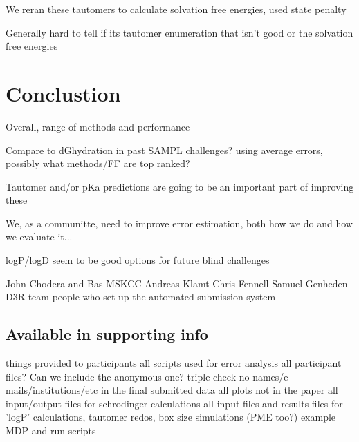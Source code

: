 We reran these tautomers to calculate solvation free energies, used state penalty %

Generally hard to tell if its tautomer enumeration that isn't good or the solvation free energies

\section{Conclustion}
\label{conclusions}

Overall, range of methods and performance

Compare to dGhydration in past SAMPL challenges? using average errors, possibly what methods/FF are top ranked?

Tautomer and/or pKa predictions are going to be an important part of improving these

We, as a communitte, need to improve error estimation, both how we do and how we evaluate it...

logP/logD seem to be good options for future blind challenges

\begin{acknowledgements} %
John Chodera and Bas MSKCC
Andreas Klamt
Chris Fennell
Samuel Genheden
D3R team
people who set up the automated submission system %


\end{acknowledgements}

\subsection{Available in supporting info} %
things provided to participants
all scripts used for error analysis
all participant files? Can we include the anonymous one? 
triple check no names/e-mails/institutions/etc in the final submitted data
all plots not in the paper
all input/output files for schrodinger calculations
all input files and results files for 'logP' calculations, tautomer redos, box size simulations (PME too?) 
example MDP and run scripts
 




